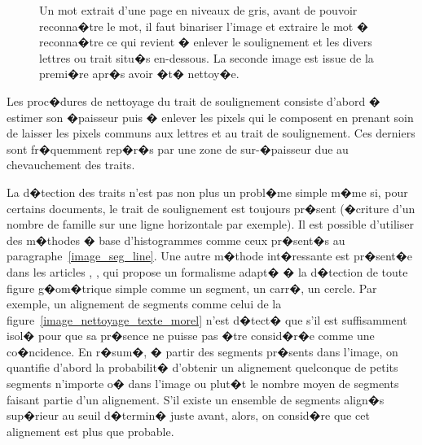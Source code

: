            \begin{figure}[ht]
        $$\begin{array}{|c|c|}\hline 
        \texttt{[image: \\filext\{../image/image/nettoy]}} &
        \texttt{[image: \\filext\{../image/image/nettoy2]}} \\ \hline
        \end{array}$$
        \caption{    Un mot extrait d'une page en niveaux de gris, avant de pouvoir reconna�tre le mot, 
                            il faut binariser l'image et extraire le mot � reconna�tre ce qui revient 
                            � enlever le soulignement et les divers lettres ou trait situ�s en-dessous. 
                            La seconde image est issue de la premi�re apr�s avoir �t� nettoy�e.}
        \label{image_nettoyage_texte}
            \end{figure}

Les proc�dures de nettoyage du trait de soulignement consiste d'abord � estimer son �paisseur puis � enlever les pixels qui le composent en prenant soin de laisser les pixels communs aux lettres et au trait de soulignement. Ces derniers sont fr�quemment rep�r�s par une zone de sur-�paisseur due au chevauchement des traits.

\label{image_nettoyage_desolneux}

La d�tection des traits n'est pas non plus un probl�me simple m�me si, pour certains documents, le trait de soulignement est toujours pr�sent (�criture d'un nombre de famille sur une ligne horizontale par exemple). Il est possible d'utiliser des m�thodes � base d'histogrammes comme ceux pr�sent�s au paragraphe~\ref{image_seg_line}. Une autre m�thode int�ressante est pr�sent�e dans les articles , ,  qui propose un formalisme adapt� � la d�tection de toute figure g�om�trique simple comme un segment, un carr�, un cercle. Par exemple, un alignement de segments comme celui de la figure~\ref{image_nettoyage_texte_morel} n'est d�tect� que s'il est suffisamment isol� pour que sa pr�sence ne puisse pas �tre consid�r�e comme une co�ncidence. En r�sum�, � partir des segments pr�sents dans l'image, on quantifie d'abord la probabilit� d'obtenir un alignement quelconque de petits segments n'importe o� dans l'image ou plut�t le nombre moyen de segments faisant partie d'un alignement. S'il existe un ensemble de segments align�s sup�rieur au seuil d�termin� juste avant, alors, on consid�re que cet alignement est plus que probable. 


